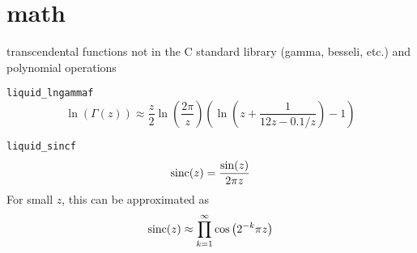 % 
%

\section{math}
\label{module:math}
transcendental functions not in the C standard library (gamma, besseli, etc.)
and polynomial operations

{\tt liquid\_lngammaf}
\[
    \ln(\Gamma(z)) \approx
    \frac{z}{2} \ln\left( \frac{2\pi}{z} \right)
    \left(
        \ln\left(z + \frac{1}{12 z - 0.1/z} \right) - 1
    \right)
\]

{\tt liquid\_sincf}
\[ \textup{sinc}(z) = \frac{\sin(z)}{2\pi z} \]
For small $z$, this can be approximated as
\[
    \textup{sinc}(z) \approx \prod_{k=1}^{\infty}{ \cos\left( 2^{-k} \pi z \right) }
\]

